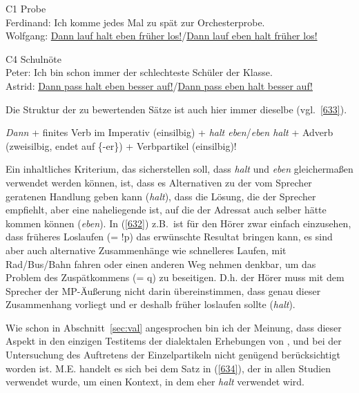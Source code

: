 \begin{exe}
	\ex\label{631} 
	C1 Probe\\
	Ferdinand: Ich komme jedes Mal zu spät zur Orchesterprobe.\\
	Wolfgang: \ul{Dann lauf halt eben früher los!}/\ul{Dann lauf eben halt früher los!}
\end{exe}

\begin{exe}
	\ex\label{632} 
	C4 Schulnöte\\
	Peter: Ich bin schon immer der schlechteste Schüler der Klasse.\\
	Astrid: \ul{Dann pass halt eben besser auf!}/\ul{Dann pass eben halt besser auf!}
\end{exe}
Die Struktur der zu bewertenden Sätze ist auch hier immer dieselbe (vgl.\ \ref{633}).

\begin{exe}
	\ex\label{633} 
	\textit{Dann} + finites Verb im Imperativ (einsilbig) + \textit{halt eben}/\textit{eben halt} + Adverb 		(zweisilbig, endet auf \{-er\}) + Verbpartikel (einsilbig)!
\end{exe}
Ein inhaltliches Kriterium, das sicherstellen soll, dass \textit{halt} und \textit{eben} gleichermaßen verwendet werden können, ist, dass es Alternativen zu der vom Sprecher geratenen Handlung geben kann (\textit{halt}), dass die Lösung, die der Sprecher empfiehlt, aber eine naheliegende ist, auf die der Adressat auch selber hätte kommen können (\textit{eben}). In (\ref{632}) z.B.\ ist für den Hörer zwar einfach einzusehen, dass früheres Loslaufen (= !p) das erwünschte Resultat bringen kann, es sind aber auch alternative Zusammenhänge wie schnelleres Laufen, mit Rad/Bus/Bahn fahren oder einen anderen Weg nehmen denkbar, um das Problem des Zuspätkommens (= q) zu beseitigen. D.h. der Hörer muss mit dem Sprecher der MP-Äußerung nicht darin übereinstimmen, dass genau dieser Zusammenhang vorliegt und er deshalb früher loslaufen sollte (\textit{halt}).

Wie schon in Abschnitt~\ref{sec:val} angesprochen bin ich der Meinung, dass dieser Aspekt in den einzigen Testitems der dialektalen Erhebungen von \citet{Eichhoff1978}, \citet{Elspass2005} und \citet{Protze1997} bei der Untersuchung des Auftretens der Einzelpartikeln nicht genügend berücksichtigt worden ist. M.E. handelt es sich bei dem Satz in (\ref{634}), der in allen Studien verwendet wurde, um einen Kontext, in dem eher \textit{halt} verwendet wird.

